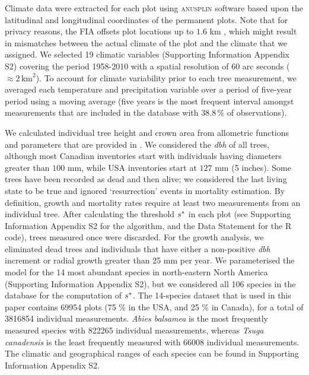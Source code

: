 Climate data were extracted for each plot using \textsc{anusplin} software \citep{McKenney2011} based upon the latitudinal and longitudinal coordinates of the permanent plots. Note that for privacy reasons, the FIA offsets plot locations up to $ 1.6 $ km \citep{Gray2012}, which might result in mismatches between the actual climate of the plot and the climate that we assigned. We selected 19 climatic variables (Supporting Information Appendix S2) covering the period 1958-2010 with a spatial resolution of 60 arc seconds ($ \approx 2 \, \text{km}^2 $). To account for climate variability prior to each tree measurement, we averaged each temperature and precipitation variable over a period of five-year period using a moving average (five years is the most frequent interval amongst measurements that are included in the database with $ 38.8 \, \% $ of observations).

We calculated individual tree height and crown area from allometric functions and parameters that are provided in \citet{Purves2007}. We considered the \textit{dbh} of all trees, although most Canadian inventories start with individuals having diameters greater than $ 100 $ mm, while USA inventories start at $ 127 $ mm (5 inches). Some trees have been recorded as dead and then alive; we considered the last living state to be true and ignored `resurrection' events in mortality estimation. By definition, growth and mortality rates require at least two measurements from an individual tree. After calculating the threshold $ {s}^{*} $ in each plot (see Supporting Information Appendix S2 for the algorithm, and the Data Statement for the R code), trees measured once were discarded. For the growth analysis, we eliminated dead trees and individuals that have either a non-positive \textit{dbh} increment or radial growth greater than 25 mm per year. We parameterised the model for the 14 most abundant species in north-eastern North America (Supporting Information Appendix S2), but we considered all 106 species in the database for the computation of $ {s}^{*} $. The 14-species dataset that is used in this paper contains \num{69954} plots (75 \% in the USA, and 25 \% in Canada), for a total of \num{3816854} individual measurements. \textit{Abies balsamea} is the most frequently measured species with \num{822265} individual measurements, whereas \textit{Tsuga canadensis} is the least frequently measured with \num{66008} individual measurements. The climatic and geographical ranges of each species can be found in Supporting Information Appendix S2.

